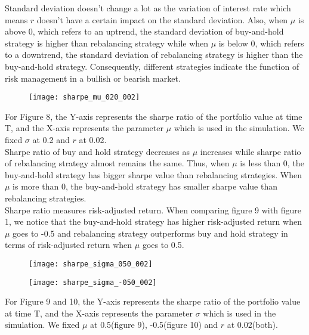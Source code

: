 \documentclass[
10pt, %
a4paper, %
oneside, %
headinclude,footinclude, %
BCOR5mm, %
]{scrartcl}
\begin{document}
Standard deviation doesn’t change a lot as the variation of interest rate which means $r$ doesn't have a certain impact on the standard deviation. Also, when $\mu$ is above 0, which refers to an uptrend, the standard deviation of buy-and-hold strategy is higher than rebalancing strategy while when $\mu$ is below 0, which refers to a downtrend, the standard deviation of rebalancing strategy is higher than the buy-and-hold strategy. Consequently, different strategies indicate the function of risk management in a bullish or bearish market. \\

\begin{figure}[H]
	\centering
	\texttt{[image: sharpe\_mu\_020\_002]}
	\caption{}
	\label{fig:sharpemu020002}
\end{figure}
For Figure 8, the Y-axis represents the sharpe ratio of the portfolio value at time T, and the X-axis represents the parameter $\mu$ which is used in the simulation. We fixed $\sigma$ at 0.2 and $r$ at 0.02.\\

Sharpe ratio of buy and hold strategy decreases as $\mu$ increases while sharpe ratio of rebalancing strategy almost remains the same. Thus, when $\mu$ is less than 0, the buy-and-hold strategy has bigger sharpe value than rebalancing strategies. When $\mu$ is more than 0, the buy-and-hold strategy has smaller sharpe value than rebalancing strategies. \\

Sharpe ratio measures risk-adjusted return. When comparing figure 9 with figure 1, we notice that the buy-and-hold strategy has higher risk-adjusted return when $\mu$ goes to -0.5 and rebalancing strategy outperforms buy and hold strategy in terms of risk-adjusted return when $\mu$ goes to 0.5.


\begin{figure}[H]
	\centering
	\texttt{[image: sharpe\_sigma\_050\_002]}
	\caption{}
	\label{fig:sharpesigma050002}
\end{figure}

\begin{figure}[H]
	\centering
	\texttt{[image: sharpe\_sigma\_-050\_002]}
	\caption{}
	\label{fig:sharpesigma-050002}
\end{figure}
For Figure 9 and 10, the Y-axis represents the sharpe ratio of the portfolio value at time T, and the X-axis represents the parameter $\sigma$ which is used in the simulation. We fixed $\mu$ at 0.5(figure 9), -0.5(figure 10) and $r$ at 0.02(both).\\
\end{document}
